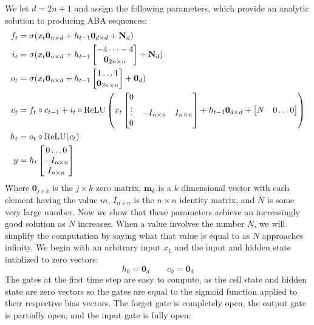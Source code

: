 We let $d = 2n + 1$ and assign the following parameters, which provide an analytic solution to producing ABA sequences:
%
\begin{align*}
  f_t &= \sigma(x_t \textbf{0}_{n\times d} + h_{t-1}\textbf{0}_{d \times d} + \textbf{N}_{d}) \\
  i_t &= \sigma(x_t\textbf{0}_{n\times d} + h_{t-1}\begin{bmatrix} -4 \dots -4 \\ \textbf{0}_{2n\times n} \end{bmatrix}  + \textbf{N}_d)   \\
  o_t &= \sigma(x_t\textbf{0}_{n\times d} +  h_{t-1} \begin{bmatrix} 1 \dots 1 \\ \textbf{0}_{2n\times n} \end{bmatrix} + \textbf{0}_{d})\\
  c_t &= f_t \circ c_{t-1} + i_t \circ \operatorname{ReLU}\left(x_t \begin{bmatrix} 0 &  & \\ \vdots & -I_{n \times n} & I_{n \times n}\\ 0 & &  \end{bmatrix} + h_{t-1}\textbf{0}_{d \times d} + \begin{bmatrix} N & 0 \dots 0\end{bmatrix}\right) \\
  h_t &= o_t \circ \operatorname{ReLU}(c_t)\\
  y &= h_t \begin{bmatrix} 0 \dots 0 \\ -I_{n \times n} \\ I_{n \times n}  \end{bmatrix}
\end{align*}
%
Where $\textbf{0}_{j\times k}$ is the $j \times k$ zero matrix, $\textbf{m}_k$ is a $k$ dimensional vector with each element having the value $m$, $I_{n\times n}$ is the $n \times n$ identity matrix, and $N$ is some very large number.  Now we show that these parameters achieve an increasingly good solution as $N$ increases. When a value involves the number $N$, we will simplify the computation by saying what that value is equal to as $N$ approaches infinity. We begin with an arbitrary input $x_1$ and the input and hidden state intialized to zero vectors:
%
\[
  h_0 = \textbf{0}_d \qquad c_0 = \textbf{0}_d
\]
%
The gates at the first time step are easy to compute, as the cell state and hidden state are zero vectors so the gates are equal to the sigmoid function applied to their respective bias vectors. The forget gate is completely open, the output gate is partially open, and the input gate is fully open:
